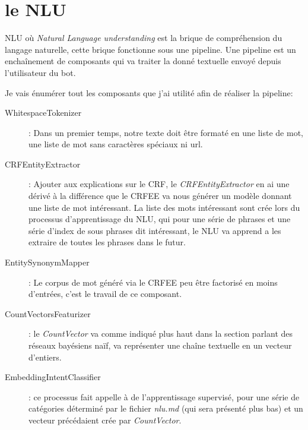 \pagebreak
\section{le NLU}
NLU où \textit{Natural Language understanding} est la brique de compréhension du langage naturelle, cette brique fonctionne sous une pipeline. Une pipeline est un enchaînement de composants qui va traiter la donné textuelle envoyé depuis l'utilisateur du bot.\\
\linebreak

Je vais énumérer tout les composants que j'ai utilité afin de réaliser la pipeline:
\begin{description}
\item[WhitespaceTokenizer]: Dans un premier temps, notre texte doit être formaté en une liste de mot, une liste de mot sans caractères spéciaux ni url.
\item[CRFEntityExtractor]: Ajouter aux explications sur le CRF, le \textit{CRFEntityExtractor} en ai une dérivé à la différence que le CRFEE va nous générer un modèle donnant une liste de mot intéressant. La liste des mots intéressant sont crée lors du processus d'apprentissage du NLU, qui pour une série de phrases et une série d'index de sous phrases dit intéressant, le NLU va apprend a les extraire de toutes les phrases dans le futur.
\item[EntitySynonymMapper]: Le corpus de mot généré via le CRFEE peu être factorisé en moins d'entrées, c'est le travail de ce composant.
\item[CountVectorsFeaturizer]: le \textit{CountVector} va comme indiqué plus haut dans la section parlant des réseaux bayésiens naïf, va représenter une chaîne textuelle en un vecteur d'entiers.
\item[EmbeddingIntentClassifier]: ce processus fait appelle à de l'apprentissage supervisé, pour une série de catégories déterminé par le fichier \textit{nlu.md} (qui sera présenté plus bas) et un vecteur précédaient crée par \textit{CountVector}.
\end{description}

